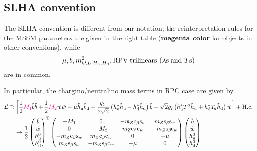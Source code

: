 \documentclass[CheatSheet]{subfiles}
\begin{document}
\subsection{SLHA convention}
The SLHA convention \cite{SLHA} is different from our notation; the reinterpretation rules for the MSSM parameters are given in the right table  (\textbf{\col magenta color} for objects in other conventions), while
\begin{equation*}
  \mu, b, m^2_{Q, L, H_{\mathrm{u}}, H_{\mathrm{d}}}, \text{RPV-trilinears ($\lambda$s and $T$s)}
\end{equation*}
 are in common.



\clearpage

In particular, the chargino/neutralino mass terms in RPC case are given by
\begin{align}
 \mathcal L\supset
&\left[
  \frac12{\color{magenta}M_1}\tilde b\tilde b
+ \frac12{\color{magenta}M_2}\tilde w\tilde w
- \mu\tilde h_{\mathrm{u}}\tilde h_{\mathrm{d}}
- \frac{g_Y}{2\sqrt2} \left(h_{\mathrm{u}}^*\tilde h_{\mathrm{u}}-h_{\mathrm{d}}^*\tilde h_{\mathrm{d}}\right)\tilde b
- \sqrt{2}{g_2} \left(h_{\mathrm{u}}^*T^a\tilde h_{\mathrm{u}}+h_{\mathrm{d}}^*T_a\tilde h_{\mathrm{d}}\right)\tilde w
\right]+\text{H.c.}
\\
&\to
\frac{1}{2}
\begin{pmatrix}\tilde b \\ \tilde w \\ h_{\mathrm{u}}^0 \\ h_{\mathrm{d}}^0\end{pmatrix}^{\mathrm{T}}
\begin{pmatrix}
 -M_1 & 0 & -m_Z \mathrm{c}_{\beta} \mathrm{s}_{w} & m_Z \mathrm{s}_{\beta} \mathrm{s}_{w} \\
 0 & -M_ 2 & m_Z \mathrm{c}_{\beta} \mathrm{c}_{w} & -m_Z \mathrm{s}_{\beta} \mathrm{c}_{w} \\
 -m_Z \mathrm{c}_{\beta} \mathrm{s}_{w} & m_Z \mathrm{c}_{\beta} \mathrm{c}_{w} & 0 & -\mu  \\
 m_Z \mathrm{s}_{\beta} \mathrm{s}_{w} & -m_Z \mathrm{s}_{\beta} \mathrm{c}_{w} & -\mu  & 0
\end{pmatrix}
\begin{pmatrix}\tilde b \\ \tilde w \\ h_{\mathrm{u}}^0 \\ h_{\mathrm{d}}^0\end{pmatrix}
\end{align}
\end{document}

